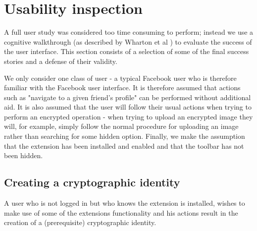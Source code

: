 \section{Usability inspection}

A full user study was considered too time consuming to perform; instead we use a cognitive walkthrough (as described by Wharton et al \cite{cogwalk}) to evaluate the success of the user interface. This section consists of a selection of some of the final success stories and a defense of their validity.

We only consider one class of user - a typical Facebook user who is therefore familiar with the Facebook user interface. It is therefore assumed that actions such as "navigate to a given friend's profile" can be performed without additional aid. It is also assumed that the user will follow their usual actions when trying to perform an encrypted operation - when trying to upload an encrypted image they will, for example, simply follow the normal procedure for uploading an image rather than searching for some hidden option. Finally, we make the assumption that the extension has been installed and enabled and that the toolbar has not been hidden.


\subsection{Creating a cryptographic identity}
A user who is not logged in but who knows the extension is installed, wishes to make use of some of the extensions functionality and his actions result in the creation of a (prerequisite) cryptographic identity.

